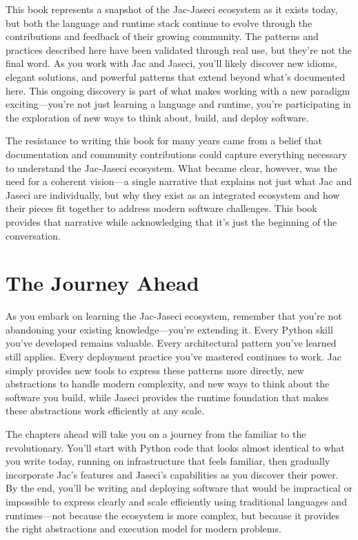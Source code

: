 This book represents a snapshot of the Jac-Jaseci ecosystem as it exists today, but both the language and runtime stack continue to evolve through the contributions and feedback of their growing community. The patterns and practices described here have been validated through real use, but they're not the final word. As you work with Jac and Jaseci, you'll likely discover new idioms, elegant solutions, and powerful patterns that extend beyond what's documented here. This ongoing discovery is part of what makes working with a new paradigm exciting—you're not just learning a language and runtime, you're participating in the exploration of new ways to think about, build, and deploy software.

The resistance to writing this book for many years came from a belief that documentation and community contributions could capture everything necessary to understand the Jac-Jaseci ecosystem. What became clear, however, was the need for a coherent vision—a single narrative that explains not just what Jac and Jaseci are individually, but why they exist as an integrated ecosystem and how their pieces fit together to address modern software challenges. This book provides that narrative while acknowledging that it's just the beginning of the conversation.

\section{The Journey Ahead}

As you embark on learning the Jac-Jaseci ecosystem, remember that you're not abandoning your existing knowledge—you're extending it. Every Python skill you've developed remains valuable. Every architectural pattern you've learned still applies. Every deployment practice you've mastered continues to work. Jac simply provides new tools to express these patterns more directly, new abstractions to handle modern complexity, and new ways to think about the software you build, while Jaseci provides the runtime foundation that makes these abstractions work efficiently at any scale.

The chapters ahead will take you on a journey from the familiar to the revolutionary. You'll start with Python code that looks almost identical to what you write today, running on infrastructure that feels familiar, then gradually incorporate Jac's features and Jaseci's capabilities as you discover their power. By the end, you'll be writing and deploying software that would be impractical or impossible to express clearly and scale efficiently using traditional languages and runtimes—not because the ecosystem is more complex, but because it provides the right abstractions and execution model for modern problems.

